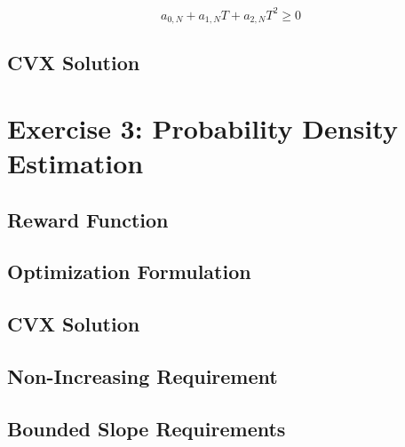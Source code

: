 \documentclass[a4paper]{article}
\begin{document}
\begin{equation}
a_{0,N} + a_{1,N} T + a_{2,N} T^2 \geq 0
\end{equation}

\subsection{CVX Solution}

\section{Exercise 3: Probability Density Estimation}
\subsection{Reward Function}

\subsection{Optimization Formulation}

\subsection{CVX Solution}

\subsection{Non-Increasing Requirement}

\subsection{Bounded Slope Requirements}
\end{document}
